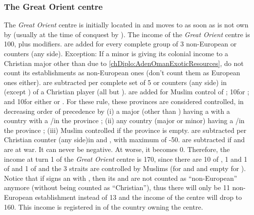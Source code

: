 \subsubsection{The Great Orient centre}
\aparag The \emph{Great Orient} centre is initially located in
\provinceNil and moves to \provinceIzmir as soon as \provinceNil is not
own by \paysEgypte (usually at the time of conquest by \TUR).
\aparag The income of the \emph{Great Orient} centre is 100\ducats, plus
modifiers.
\ducats are added for every complete group of 3 non-European
\COL or \TP counters (any side).
\bparag Exception: If a minor is giving its colonial income to a
Christian major other than \VEN due to
\ref{chDiplo:AdenOmanExoticResources}, do not count its establishments
as non-European ones (don't count them as European ones either).
\ducats are subtracted per complete set of 5 \COL or \TP
counters (any side) in  (except ) of
a Christian player (all but \TUR).
\ducats are added for Muslim control of ;
10\ducats for ; and 10\ducats for either
 or . For these rule, these
provinces are considered controlled, in decreasing order of precedence
by (i) a major (other than \VEN) having a \dipAT with a country with a
\COL/\TP in the province ; (ii) any country (major or minor) having a
\COL/\TP in the province ; (iii) Muslim controlled if the province is
empty.
\ducats are subtracted per Christian \TradeFLEET counter (any
side)in  and , with maximum of -50\ducats.
\ducats are subtracted if \TUR and  are at war.
\bparag It can never be negative. At worse, it becomes 0\ducats.
\bparag Therefore, the income at turn 1 of the \emph{Great Orient}
centre is 170\ducats, since there are 10 \TP of , 1 \TP
and 1 \COL of  and 1 \COL of  and the 3 straits
are controlled by Muslims (\paysGujarat for  and
\provinceOrmuz and empty for \provinceSocotra).
\bparag Notice that if \POR signs an \dipAT with \paysAden, then its
\COL and \TP are not counted as ``non-European'' anymore (without being
counted as ``Christian''), thus there will only be 11 non-European
establishment instead of 13 and the income of the centre will drop to
160\ducats.
\bparag This income is registered in 
of the country owning the centre.

